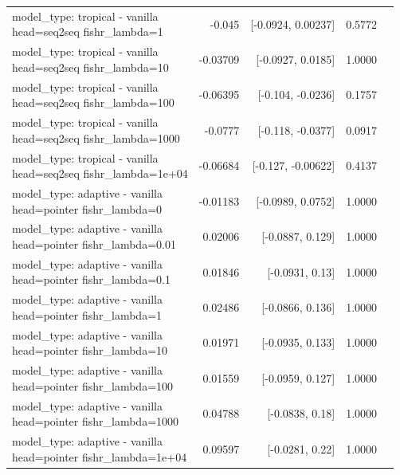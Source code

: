 \documentclass[10pt]{article}
\makeatletter
\newcommand{\stackcell}[1]{\begin{tabular}[t]{@{}l@{}}#1\end{tabular}}
\makeatother
\begin{document}
{\begin{longtable}{lrrrl}
\stackcell{model\_type: tropical - vanilla\\\footnotesize head=seq2seq fishr\_lambda=1 } & -0.045 & [-0.0924, 0.00237] & 0.5772 & \\
\stackcell{model\_type: tropical - vanilla\\\footnotesize head=seq2seq fishr\_lambda=10 } & -0.03709 & [-0.0927, 0.0185] & 1.0000 & \\
\stackcell{model\_type: tropical - vanilla\\\footnotesize head=seq2seq fishr\_lambda=100 } & -0.06395 & [-0.104, -0.0236] & 0.1757 & \\
\stackcell{model\_type: tropical - vanilla\\\footnotesize head=seq2seq fishr\_lambda=1000 } & -0.0777 & [-0.118, -0.0377] & 0.0917 & \\
\stackcell{model\_type: tropical - vanilla\\\footnotesize head=seq2seq fishr\_lambda=1e+04 } & -0.06684 & [-0.127, -0.00622] & 0.4137 & \\
\stackcell{model\_type: adaptive - vanilla\\\footnotesize head=pointer fishr\_lambda=0 } & -0.01183 & [-0.0989, 0.0752] & 1.0000 & \\
\stackcell{model\_type: adaptive - vanilla\\\footnotesize head=pointer fishr\_lambda=0.01 } & 0.02006 & [-0.0887, 0.129] & 1.0000 & \\
\stackcell{model\_type: adaptive - vanilla\\\footnotesize head=pointer fishr\_lambda=0.1 } & 0.01846 & [-0.0931, 0.13] & 1.0000 & \\
\stackcell{model\_type: adaptive - vanilla\\\footnotesize head=pointer fishr\_lambda=1 } & 0.02486 & [-0.0866, 0.136] & 1.0000 & \\
\stackcell{model\_type: adaptive - vanilla\\\footnotesize head=pointer fishr\_lambda=10 } & 0.01971 & [-0.0935, 0.133] & 1.0000 & \\
\stackcell{model\_type: adaptive - vanilla\\\footnotesize head=pointer fishr\_lambda=100 } & 0.01559 & [-0.0959, 0.127] & 1.0000 & \\
\stackcell{model\_type: adaptive - vanilla\\\footnotesize head=pointer fishr\_lambda=1000 } & 0.04788 & [-0.0838, 0.18] & 1.0000 & \\
\stackcell{model\_type: adaptive - vanilla\\\footnotesize head=pointer fishr\_lambda=1e+04 } & 0.09597 & [-0.0281, 0.22] & 1.0000 & \\

\end{longtable}}
\end{document}
